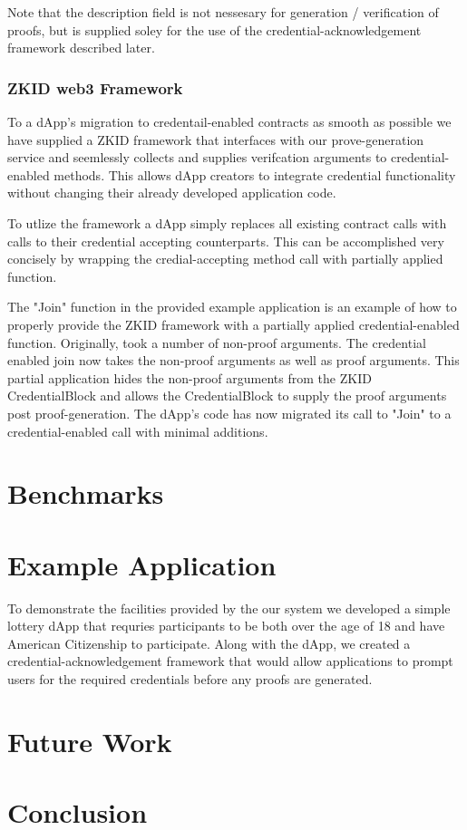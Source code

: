 \documentclass[11 pt]{extarticle}
\theoremstyle{remark}
\begin{document}
Note that the description field is not nessesary for generation / verification of proofs, but is supplied soley for
the use of the credential-acknowledgement framework described later. 

\subsubsection{ZKID web3 Framework}

To a dApp's migration to credentail-enabled contracts as smooth as possible we have supplied a ZKID framework that interfaces
with our prove-generation service and seemlessly collects and supplies verifcation arguments to credential-enabled methods. This 
allows dApp creators to integrate credential functionality without changing their already developed application code.

To utlize the framework a dApp simply replaces all existing contract calls with calls to their credential accepting counterparts. 
This can be accomplished very concisely by wrapping the credial-accepting method call with partially applied
function.

The "Join" function in the provided example application is an example of how to properly provide the ZKID framework with a partially applied credential-enabled function. Originally, took a number of non-proof arguments. 
The credential enabled join now takes the non-proof arguments as well as proof arguments. This partial application hides the non-proof arguments from the ZKID CredentialBlock and allows the CredentialBlock to 
supply the proof arguments post proof-generation. The dApp's code has now migrated its call to "Join" to a credential-enabled call with minimal additions.

\section{Benchmarks}

\section{Example Application}

To demonstrate the facilities provided by the our system we developed a simple lottery dApp that requries participants to be
both over the age of 18 and have American Citizenship to participate. Along with the dApp, we created a credential-acknowledgement
framework that would allow applications to prompt users for the required credentials before any proofs are generated.



\section{Future Work}

\section{Conclusion}



\end{document}

